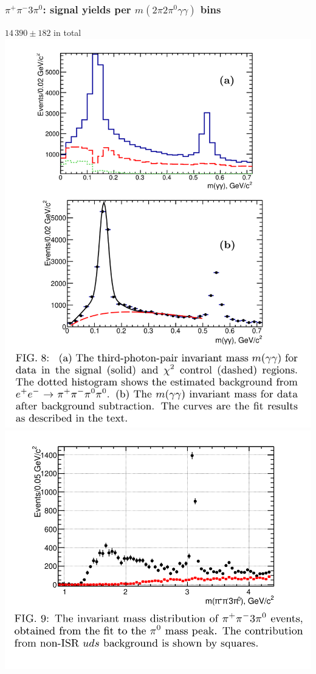 \documentclass[10pt, aspectratio=169]{beamer}
\def\pip{\pi^+}
\def\pim{\pi^-}
\def\piz{\pi^0}
\begin{document}
\begin{frame}[label=3pi-signal]%
  \frametitle{$\pip\pim3\piz$: signal yields per 
  $m(2\pi2\piz\gamma\gamma)$ bins}
  \centering

  $14\,390 \pm 182$ in total \\[1ex]

  \includegraphics[width=.35\linewidth]{figures/003/fig008}
  \includegraphics[width=.5\linewidth]{figures/003/fig009}
\end{frame}%
\end{document}
